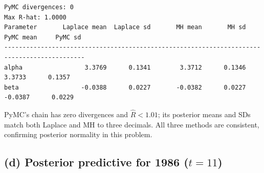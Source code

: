 \documentclass[
  letterpaper,
  DIV=11,
  numbers=noendperiod]{scrartcl}
\begin{document}
\begin{verbatim}
PyMC divergences: 0
Max R-hat: 1.0000
Parameter       Laplace mean  Laplace sd       MH mean       MH sd     PyMC mean     PyMC sd
--------------------------------------------------------------------------------------------
alpha                 3.3769      0.1341        3.3712      0.1346        3.3733      0.1357
beta                 -0.0388      0.0227       -0.0382      0.0227       -0.0387      0.0229
\end{verbatim}

PyMC's chain has zero divergences and \(\hat R < 1.01\); its posterior
means and SDs match both Laplace and MH to three decimals. All three
methods are consistent, confirming posterior normality in this problem.

\subsection{\texorpdfstring{(d) Posterior predictive for 1986
(\(t = 11\))}{(d) Posterior predictive for 1986 (t = 11)}}\label{d-posterior-predictive-for-1986-t-11}
\end{document}
